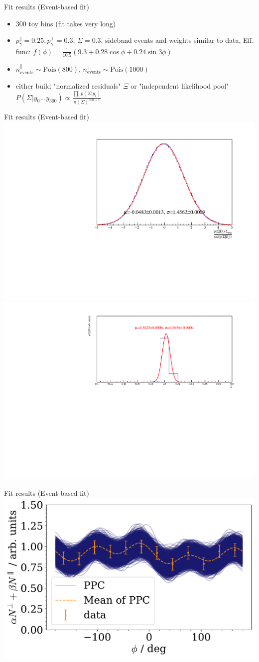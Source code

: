 \documentclass[11pt,aspectratio=169,dvipsnames]{beamer}
\begin{document}
\begin{frame}{Fit results (Event-based fit)}
		\begin{itemize}[label=$\blacktriangleright$]
	\item 300 toy bins (fit takes very long)
	\item $p_\gamma^\parallel=0.25,p_\gamma^\bot=0.3$, $\Sigma=0.3$, sideband events and weights similar to data, Eff. func: $f(\phi)=\frac{1}{10.5}(9.3+0.28\cos\phi+0.24\sin3\phi)$
	\item $n_\text{events}^\parallel\sim\text{Pois}(800)$, $n_\text{events}^\bot\sim\text{Pois}(1000)$ 
	\item either build "normalized residuals" $\Xi$ or "independent likelihood pool" $P(\Sigma|y_0\dots y_{300})\propto\frac{\prod_ip(\Sigma|y_i)}{\pi(\Sigma)^{300-1}}$
\end{itemize}
\end{frame}
\begin{frame}{Fit results (Event-based fit)}
	\centering
	\includegraphics[width=.49\linewidth]{../../bayes/event_based_fit/plots/combined_post_add.pdf}
	\includegraphics[width=.49\linewidth]{../../bayes/event_based_fit/plots/combined_post_mul.pdf}
	\end{frame}
\begin{frame}{Fit results (Event-based fit)}
		\centering
		\includegraphics[width=.8\linewidth]{../../bayes/event_based_fit/plots/toyMC_eff_PPC.pdf}
\end{frame}
\end{document}
